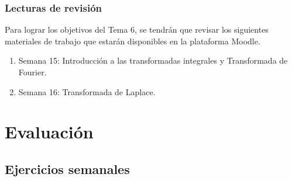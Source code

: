 \documentclass[12pt]{beamer}
\begin{document}
\begin{frame}
\frametitle{Lecturas de revisión}
Para lograr los objetivos del Tema 6, se tendrán que revisar los siguientes materiales de trabajo que estarán disponibles en la plataforma Moodle.
\\
\bigskip
\pause
{}
\begin{enumerate}[<+->]
\item Semana 15: Introducción a las transformadas integrales y Transformada de Fourier.
\item Semana 16: Transformada de Laplace.
\end{enumerate}
\end{frame}

\section{Evaluación}
\subsection{Ejercicios semanales}
\end{document}
